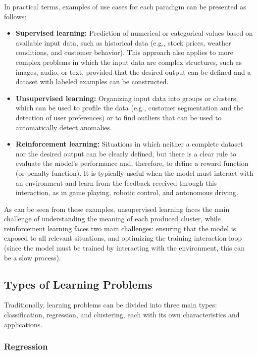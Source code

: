 In practical terms, examples of use cases for each paradigm can be presented as follows:
\begin{itemize}
    \item \textbf{Supervised learning:} Prediction of numerical or categorical values based on available input data, such as historical data (e.g., stock prices, weather conditions, and customer behavior). This approach also applies to more complex problems in which the input data are complex structures, such as images, audio, or text, provided that the desired output can be defined and a dataset with labeled examples can be constructed.
    \item \textbf{Unsupervised learning:} Organizing input data into groups or clusters, which can be used to profile the data (e.g., customer segmentation and the detection of user preferences) or to find outliers that can be used to automatically detect anomalies.
    \item \textbf{Reinforcement learning:} Situations in which neither a complete dataset nor the desired output can be clearly defined, but there is a clear rule to evaluate the model's performance and, therefore, to define a reward function (or penalty function). It is typically useful when the model must interact with an environment and learn from the feedback received through this interaction, as in game playing, robotic control, and autonomous driving.
\end{itemize}

As can be seen from these examples, unsupervised learning faces the main challenge of understanding the meaning of each produced cluster, while reinforcement learning faces two main challenges: ensuring that the model is exposed to all relevant situations, and optimizing the training interaction loop (since the model must be trained by interacting with the environment, this can be a slow process).

\subsection{Types of Learning Problems}

Traditionally, learning problems can be divided into three main types: classification, regression, and clustering, each with its own characteristics and applications.

\subsubsection{Regression}

